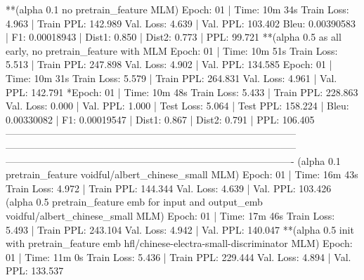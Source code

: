 \documentclass[letterpaper]{article} %
\begin{document}
\begin{CJK*}{UTF8}{gbsn}
**(alpha 0.1 no pretrain_feature MLM)
Epoch: 01 | Time: 10m 34s
	Train Loss: 4.963 | Train PPL: 142.989
	 Val. Loss: 4.639 |  Val. PPL: 103.402
Bleu: 0.00390583 | F1: 0.00018943 | Dist1: 0.850 | Dist2: 0.773 | PPL:  99.721
**(alpha 0.5 as all early, no pretrain_feature with MLM %
Epoch: 01 | Time: 10m 51s
	Train Loss: 5.513 | Train PPL: 247.898
	 Val. Loss: 4.902 |  Val. PPL: 134.585
Epoch: 01 | Time: 10m 31s
	Train Loss: 5.579 | Train PPL: 264.831
	 Val. Loss: 4.961 |  Val. PPL: 142.791
*Epoch: 01 | Time: 10m 48s
	Train Loss: 5.433 | Train PPL: 228.863
	 Val. Loss: 0.000 |  Val. PPL:   1.000
| Test Loss: 5.064 | Test PPL: 158.224 |
Bleu: 0.00330082 | F1: 0.00019547 | Dist1: 0.867 | Dist2: 0.791 | PPL: 106.405
-----------------------------------------------------------------------------------------
-----------------------------------------------------------------------------------------
----------------------------------------------------------------------------------------
(alpha 0.1 pretrain_feature voidful/albert_chinese_small MLM)
Epoch: 01 | Time: 16m 43s
	Train Loss: 4.972 | Train PPL: 144.344
	 Val. Loss: 4.639 |  Val. PPL: 103.426
(alpha 0.5 pretrain_feature emb for input and output_emb voidful/albert_chinese_small MLM)
Epoch: 01 | Time: 17m 46s
	Train Loss: 5.493 | Train PPL: 243.104
	 Val. Loss: 4.942 |  Val. PPL: 140.047
**(alpha 0.5 init with pretrain_feature emb hfl/chinese-electra-small-discriminator MLM)
Epoch: 01 | Time: 11m 0s
	Train Loss: 5.436 | Train PPL: 229.444
	 Val. Loss: 4.894 |  Val. PPL: 133.537


\end{CJK*}
\end{document}
